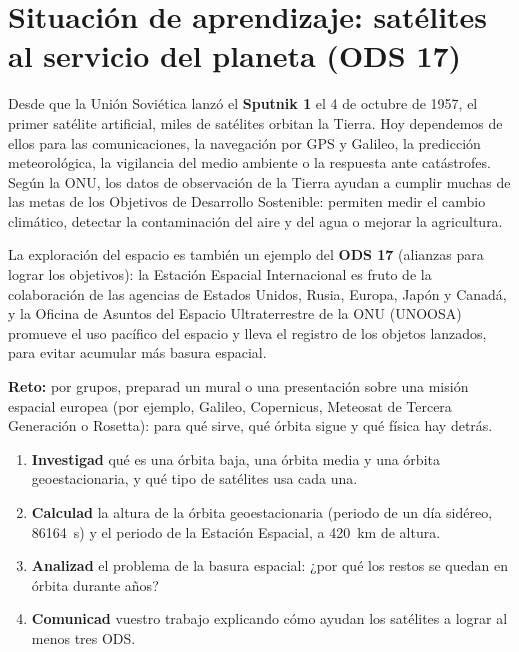 \section{Situación de aprendizaje: satélites al servicio del planeta (ODS 17)}\label{sec:ud11-ods}

Desde que la Unión Soviética lanzó el \textbf{Sputnik 1} el 4 de octubre de 1957, el primer satélite artificial, miles de satélites
orbitan la Tierra. Hoy dependemos de ellos para las comunicaciones, la navegación por GPS y Galileo, la predicción meteorológica, la
vigilancia del medio ambiente o la respuesta ante catástrofes. Según la ONU, los datos de observación de la Tierra ayudan a cumplir
muchas de las metas de los Objetivos de Desarrollo Sostenible: permiten medir el cambio climático, detectar la contaminación del aire y
del agua o mejorar la agricultura.

La exploración del espacio es también un ejemplo del \textbf{ODS 17} (alianzas para lograr los objetivos): la Estación Espacial
Internacional es fruto de la colaboración de las agencias de Estados Unidos, Rusia, Europa, Japón y Canadá, y la Oficina de Asuntos del
Espacio Ultraterrestre de la ONU (UNOOSA) promueve el uso pacífico del espacio y lleva el registro de los objetos lanzados, para
evitar acumular más basura espacial.

\begin{marker}
    \textbf{Reto:} por grupos, preparad un mural o una presentación sobre una misión espacial europea (por ejemplo, Galileo, Copernicus,
    Meteosat de Tercera Generación o Rosetta): para qué sirve, qué órbita sigue y qué física hay detrás.
\end{marker}

\begin{enumerate}[label=\numberballred]
    \item \textbf{Investigad} qué es una órbita baja, una órbita media y una órbita geoestacionaria, y qué tipo de satélites usa cada una.
    \item \textbf{Calculad} la altura de la órbita geoestacionaria (periodo de un día sidéreo, \qty{86164}{\s}) y el periodo de la
    Estación Espacial, a \qty{420}{\km} de altura.
    \item \textbf{Analizad} el problema de la basura espacial: ¿por qué los restos se quedan en órbita durante años?
    \item \textbf{Comunicad} vuestro trabajo explicando cómo ayudan los satélites a lograr al menos tres ODS.
\end{enumerate}

